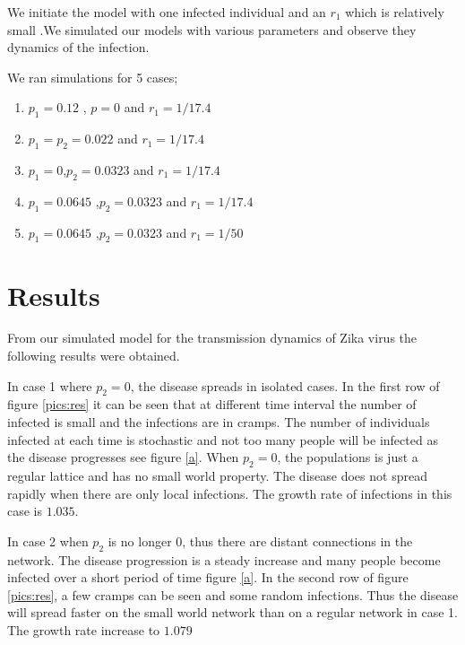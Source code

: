We initiate the model with one infected individual and an $r_1$ which is relatively small .We simulated our models with various parameters and observe they dynamics  of the infection. 

We ran simulations for 5 cases;
\begin{enumerate}
\item $p_1 = 0.12$ , $p =0$ and $r_1 = 1/17.4$
\item $p_1 = p_2 = 0.022$ and $r_1 = 1/17.4$ 
\item $p_1 =0 $,$p_2 = 0.0323$ and $r_1 = 1/17.4$
\item $p_1 = 0.0645$ ,$p_2 = 0.0323$ and $r_1 = 1/17.4$
\item $p_1 = 0.0645$ ,$p_2 = 0.0323$ and $r_1 = 1/50$
\end{enumerate}


\section{Results}
From our simulated model for the transmission dynamics of Zika virus the following results were obtained.




In case 1 where $p_2 =0$, the disease spreads in isolated cases. In the first row of figure  \ref{pics:res} it can be seen that at different time interval the number of infected is small and  the infections are in cramps.
The number of individuals infected at each time is stochastic and not too many people will be infected as the disease progresses see figure \ref{a}.  When $p_2 = 0$, the populations is just a regular lattice and has no small world property. The disease does not spread rapidly when there are only local infections. The growth rate of infections in this case is $1.035$.

In case 2 when $p_2$ is no longer 0, thus  there are distant connections in the network. The disease progression is a steady increase and many people become infected over a short period of time figure \ref{a}. In the second row of figure \ref{pics:res}, a few cramps can be seen and some random infections.  Thus the disease will spread faster on the small world network than on a regular network in case 1. The growth rate increase to $1.079$


